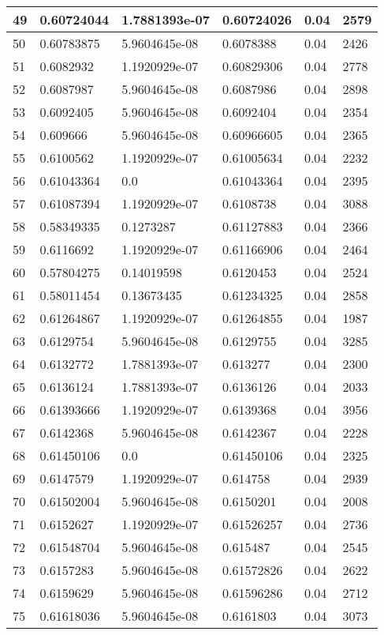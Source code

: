 \begin{longtable}{|l|l|l|l|l|l|}
49 & 0.60724044 & 1.7881393e-07 & 0.60724026 & 0.04 & 2579 \\ \hline 
50 & 0.60783875 & 5.9604645e-08 & 0.6078388 & 0.04 & 2426 \\ \hline 
51 & 0.6082932 & 1.1920929e-07 & 0.60829306 & 0.04 & 2778 \\ \hline 
52 & 0.6087987 & 5.9604645e-08 & 0.6087986 & 0.04 & 2898 \\ \hline 
53 & 0.6092405 & 5.9604645e-08 & 0.6092404 & 0.04 & 2354 \\ \hline 
54 & 0.609666 & 5.9604645e-08 & 0.60966605 & 0.04 & 2365 \\ \hline 
55 & 0.6100562 & 1.1920929e-07 & 0.61005634 & 0.04 & 2232 \\ \hline 
56 & 0.61043364 & 0.0 & 0.61043364 & 0.04 & 2395 \\ \hline 
57 & 0.61087394 & 1.1920929e-07 & 0.6108738 & 0.04 & 3088 \\ \hline 
58 & 0.58349335 & 0.1273287 & 0.61127883 & 0.04 & 2366 \\ \hline 
59 & 0.6116692 & 1.1920929e-07 & 0.61166906 & 0.04 & 2464 \\ \hline 
60 & 0.57804275 & 0.14019598 & 0.6120453 & 0.04 & 2524 \\ \hline 
61 & 0.58011454 & 0.13673435 & 0.61234325 & 0.04 & 2858 \\ \hline 
62 & 0.61264867 & 1.1920929e-07 & 0.61264855 & 0.04 & 1987 \\ \hline 
63 & 0.6129754 & 5.9604645e-08 & 0.6129755 & 0.04 & 3285 \\ \hline 
64 & 0.6132772 & 1.7881393e-07 & 0.613277 & 0.04 & 2300 \\ \hline 
65 & 0.6136124 & 1.7881393e-07 & 0.6136126 & 0.04 & 2033 \\ \hline 
66 & 0.61393666 & 1.1920929e-07 & 0.6139368 & 0.04 & 3956 \\ \hline 
67 & 0.6142368 & 5.9604645e-08 & 0.6142367 & 0.04 & 2228 \\ \hline 
68 & 0.61450106 & 0.0 & 0.61450106 & 0.04 & 2325 \\ \hline 
69 & 0.6147579 & 1.1920929e-07 & 0.614758 & 0.04 & 2939 \\ \hline 
70 & 0.61502004 & 5.9604645e-08 & 0.6150201 & 0.04 & 2008 \\ \hline 
71 & 0.6152627 & 1.1920929e-07 & 0.61526257 & 0.04 & 2736 \\ \hline 
72 & 0.61548704 & 5.9604645e-08 & 0.615487 & 0.04 & 2545 \\ \hline 
73 & 0.6157283 & 5.9604645e-08 & 0.61572826 & 0.04 & 2622 \\ \hline 
74 & 0.6159629 & 5.9604645e-08 & 0.61596286 & 0.04 & 2712 \\ \hline 
75 & 0.61618036 & 5.9604645e-08 & 0.6161803 & 0.04 & 3073 \\ \hline 
\end{longtable}